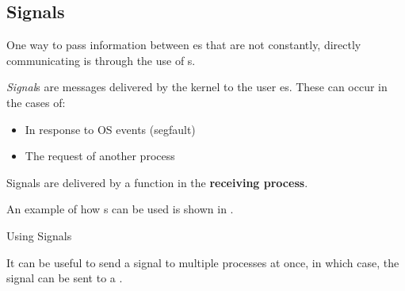 \subsection{Signals}\label{subsec:Signals}
One way to pass information between es that are not constantly, directly communicating is through the use of s.

\begin{definition}[Signal]\label{def:Signal}
  \emph{Signal}s are messages delivered by the kernel to the user es.
  These can occur in the cases of:
  \begin{itemize}[noitemsep]
  \item In response to OS events (segfault)
  \item The request of another process
  \end{itemize}

  Signals are delivered by a  function in the \textbf{receiving process}.
\end{definition}

An example of how s can be used is shown in .

\begin{listing}[h!tbp]
\caption{Using Signals}
\label{lst:Using_Signals}
\end{listing}

It can be useful to send a signal to multiple processes at once, in which case, the signal can be sent to a .

